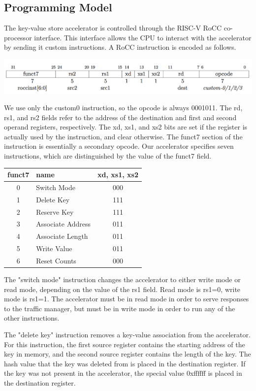 \subsection{Programming Model}

The key-value store accelerator is controlled through the RISC-V RoCC
co-processor interface. This interface allows the CPU to interact with the
accelerator by sending it custom instructions. A RoCC instruction is encoded
as follows.

\includegraphics[width=0.9\linewidth]{../../img/rocc-encoding.png}

We use only the custom0 instruction, so the opcode is always 0001011.
The rd, rs1, and rs2 fields refer to the address of the destination and
first and second operand registers, respectively. The xd, xs1, and xs2 bits
are set if the register is actually used by the instruction, and clear
otherwise. The funct7 section of the instruction is essentially a secondary
opcode. Our accelerator specifies seven instructions, which are distinguished
by the value of the funct7 field.

\begin{tabular}{|c|l|c|}
    \hline
    funct7 & name & xd, xs1, xs2 \\
    \hline
    0 & Switch Mode & 000 \\
    1 & Delete Key & 111 \\
    2 & Reserve Key & 111 \\
    3 & Associate Address & 011 \\
    4 & Associate Length & 011 \\
    5 & Write Value & 011 \\
    6 & Reset Counts & 000 \\
    \hline
\end{tabular}

The "switch mode" instruction changes the accelerator to either write mode or
read mode, depending on the value of the rs1 field. Read mode is rs1=0,
write mode is rs1=1. The accelerator must be in read mode in order to serve
responses to the traffic manager, but must be in write mode in order to run
any of the other instructions.

The "delete key" instruction removes a key-value association from the
accelerator. For this instruction, the first source register contains the
starting address of the key in memory, and the second source register contains
the length of the key. The hash value that the key was deleted from is placed
in the destination register. If the key was not present in the accelerator,
the special value 0xffffff is placed in the destination register.

